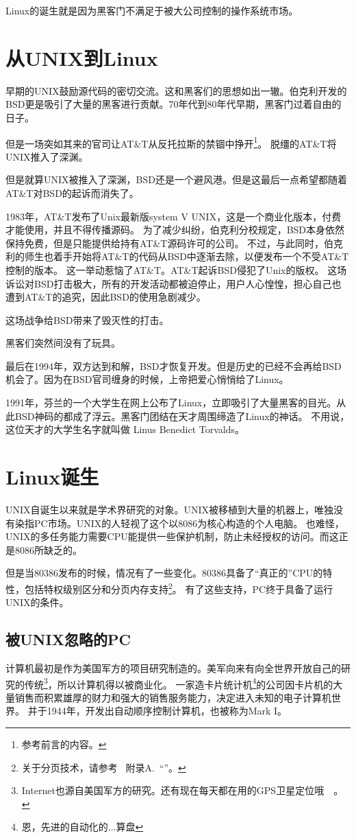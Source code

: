 \documentclass[amstex,twoside]{ctexbook}
\newcommand{\faqref}[1]{~附录A.\nameref{FAQ}~“\nameref{#1}”}
\begin{document}
Linux的诞生就是因为黑客门不满足于被大公司控制的操作系统市场。

\section{从UNIX到Linux}

早期的UNIX鼓励源代码的密切交流。这和黑客们的思想如出一辙。伯克利开发的BSD更是吸引了大量的黑客进行贡献。70年代到80年代早期，黑客门过着自由的日子。


但是一场突如其来的官司让AT\&T从反托拉斯的禁锢中挣开\footnote{参考前言的内容。}。
脱缰的AT\&T将UNIX推入了深渊。

但是就算UNIX被推入了深渊，BSD还是一个避风港。但是这最后一点希望都随着AT\&T对BSD的起诉而消失了。

1983年，AT\&T发布了Unix最新版system V UNIX，这是一个商业化版本，付费才能使用，并且不得传播源码。
为了减少纠纷，伯克利分校规定，BSD本身依然保持免费，但是只能提供给持有AT\&T源码许可的公司。
不过，与此同时，伯克利的师生也着手开始将AT\&T的代码从BSD中逐渐去除，以便发布一个不受AT\&T控制的版本。
这一举动惹恼了AT\&T。AT\&T起诉BSD侵犯了Unix的版权。
这场诉讼对BSD打击极大，所有的开发活动都被迫停止，用户人心惶惶，担心自己也遭到AT\&T的追究，因此BSD的使用急剧减少。

这场战争给BSD带来了毁灭性的打击。


黑客们突然间没有了玩具。

最后在1994年，双方达到和解，BSD才恢复开发。但是历史的已经不会再给BSD机会了。因为在BSD官司缠身的时候，上帝把爱心悄悄给了Linux。

1991年，芬兰的一个大学生在网上公布了Linux，立即吸引了大量黑客的目光。从此BSD神码的都成了浮云。黑客门团结在天才周围缔造了Linux的神话。
不用说，这位天才的大学生名字就叫做 Linus Benedict Torvalds。

\section{Linux诞生}

UNIX自诞生以来就是学术界研究的对象。UNIX被移植到大量的机器上，唯独没有染指PC市场。UNIX的人轻视了这个以8086为核心构造的个人电脑。
也难怪，UNIX的多任务能力需要CPU能提供一些保护机制，防止未经授权的访问。而这正是8086所缺乏的。

但是当80386发布的时候，情况有了一些变化。80386具备了“真正的”CPU的特性，包括特权级别区分和分页内存支持\footnote{关于分页技术，请参考 \faqref{FAQ:Paging}。}。 有了这些支持，PC终于具备了运行UNIX的条件。

\subsection{被UNIX忽略的PC}
计算机最初是作为美国军方的项目研究制造的。美军向来有向全世界开放自己的研究的传统\footnote{Internet也源自美国军方的研究。还有现在每天都在用的GPS卫星定位哦~~。}，所以计算机得以被商业化。
一家造卡片统计机\footnote{恩，先进的自动化的...算盘}的公司因卡片机的大量销售而积累雄厚的财力和强大的销售服务能力，决定进入未知的电子计算机世界。
并于1944年，开发出自动顺序控制计算机，也被称为Mark  I。
\end{document}
